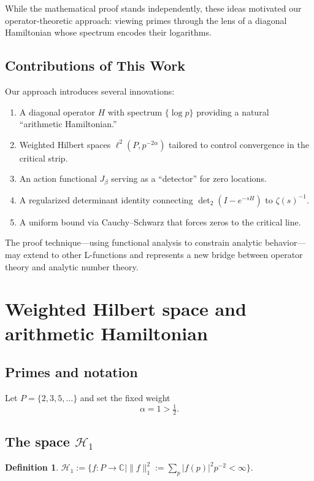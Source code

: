 \documentclass[12pt]{article}
\theoremstyle{definition}
\newtheorem{definition}[theorem]{Definition}
\theoremstyle{remark}
\newcommand{\Hspace}{\mathcal H}
\begin{document}
While the mathematical proof stands independently, these ideas motivated our 
operator-theoretic approach: viewing primes through the lens of a diagonal 
Hamiltonian whose spectrum encodes their logarithms.

\subsection{Contributions of This Work}

Our approach introduces several innovations:
\begin{enumerate}
\item A diagonal operator $H$ with spectrum $\{\log p\}$ providing a natural 
``arithmetic Hamiltonian.''
\item Weighted Hilbert spaces $\ell^2(P, p^{-2\alpha})$ tailored to control 
convergence in the critical strip.
\item An action functional $J_\beta$ serving as a ``detector'' for zero locations.
\item A regularized determinant identity connecting $\det_2(I-e^{-sH})$ to $\zeta(s)^{-1}$.
\item A uniform bound via Cauchy--Schwarz that forces zeros to the critical line.
\end{enumerate}

The proof technique---using functional analysis to constrain analytic 
behavior---may extend to other L-functions and represents a new bridge between 
operator theory and analytic number theory.

\section{Weighted Hilbert space and arithmetic Hamiltonian}

\subsection{Primes and notation}
Let \(P=\{2,3,5,\dots\}\) and set the fixed weight
\[
   \alpha=1> \tfrac12.
\]

\subsection{The space \(\Hspace_1\)}
\begin{definition}
\(
   \Hspace_{1}:=
   \bigl\{f:P\to\mathbb C \mid
          \|f\|_{1}^{2}:=\sum_{p}|f(p)|^{2}p^{-2}<\infty\bigr\}.
\)
\end{definition}
\end{document}
